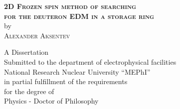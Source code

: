 
\begin{center}

\textsc{\textbf{ 2D Frozen spin method of searching  \\
	for the deuteron EDM in a storage ring  }}\\[2cm]

by \\[2cm]

% 
\textsc{ Alexander Aksentev \\[2.4cm] }

A Dissertation \\
Submitted to the department of electrophysical facilities \\
National Research Nuclear University ``MEPhI''\\
in partial fulfillment of the requirements\\
for the degree of\\[1cm]
Physics - Doctor of Philosophy


\end{center}




\vfill


\begin{center}
\the\year{}
\end{center}



